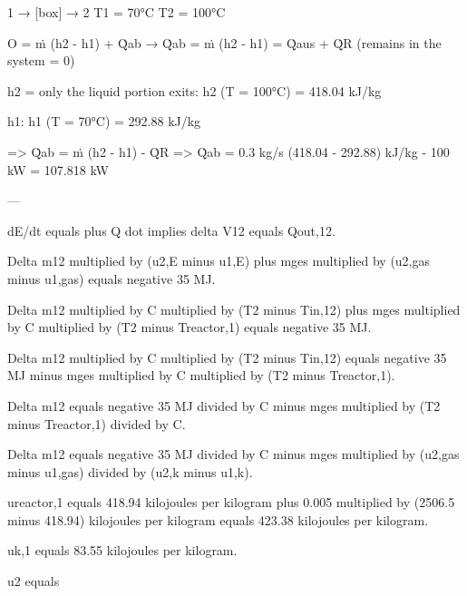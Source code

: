 1 → [box] → 2  
T1 = 70°C  
T2 = 100°C  

O = ṁ (h2 - h1) + Q̇ab → Q̇ab = ṁ (h2 - h1) = Q̇aus + Q̇R  
(remains in the system = 0)  

h2 = only the liquid portion exits:  
h2 (T = 100°C) = 418.04 kJ/kg  

h1:  
h1 (T = 70°C) = 292.88 kJ/kg  

=> Q̇ab = ṁ (h2 - h1) - Q̇R  
=> Q̇ab = 0.3 kg/s (418.04 - 292.88) kJ/kg - 100 kW  
= 107.818 kW  

---

dE/dt equals plus Q dot implies delta V12 equals Qout,12.  

Delta m12 multiplied by (u2,E minus u1,E) plus mges multiplied by (u2,gas minus u1,gas) equals negative 35 MJ.  

Delta m12 multiplied by C multiplied by (T2 minus Tin,12) plus mges multiplied by C multiplied by (T2 minus Treactor,1) equals negative 35 MJ.  

Delta m12 multiplied by C multiplied by (T2 minus Tin,12) equals negative 35 MJ minus mges multiplied by C multiplied by (T2 minus Treactor,1).  

Delta m12 equals negative 35 MJ divided by C minus mges multiplied by (T2 minus Treactor,1) divided by C.  

Delta m12 equals negative 35 MJ divided by C minus mges multiplied by (u2,gas minus u1,gas) divided by (u2,k minus u1,k).  

ureactor,1 equals 418.94 kilojoules per kilogram plus 0.005 multiplied by (2506.5 minus 418.94) kilojoules per kilogram equals 423.38 kilojoules per kilogram.  

uk,1 equals 83.55 kilojoules per kilogram.  

u2 equals